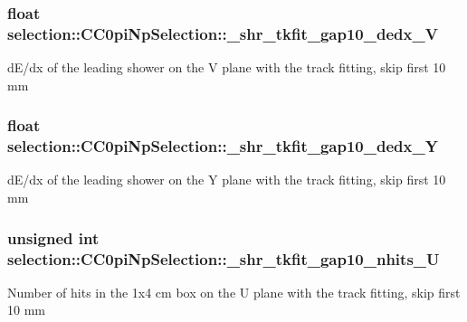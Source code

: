 \subsubsection[{\texorpdfstring{\+\_\+shr\+\_\+tkfit\+\_\+gap10\+\_\+dedx\+\_\+V}{_shr_tkfit_gap10_dedx_V}}]{\setlength{\rightskip}{0pt plus 5cm}float selection\+::\+C\+C0pi\+Np\+Selection\+::\+\_\+shr\+\_\+tkfit\+\_\+gap10\+\_\+dedx\+\_\+V\hspace{0.3cm}{\ttfamily [private]}}\hypertarget{classselection_1_1CC0piNpSelection_adf21374d01634ceeb71cdcb954c40b98}{}\label{classselection_1_1CC0piNpSelection_adf21374d01634ceeb71cdcb954c40b98}
d\+E/dx of the leading shower on the V plane with the track fitting, skip first 10 mm 
\subsubsection[{\texorpdfstring{\+\_\+shr\+\_\+tkfit\+\_\+gap10\+\_\+dedx\+\_\+Y}{_shr_tkfit_gap10_dedx_Y}}]{\setlength{\rightskip}{0pt plus 5cm}float selection\+::\+C\+C0pi\+Np\+Selection\+::\+\_\+shr\+\_\+tkfit\+\_\+gap10\+\_\+dedx\+\_\+Y\hspace{0.3cm}{\ttfamily [private]}}\hypertarget{classselection_1_1CC0piNpSelection_ae4ccdcc53f1b3e72cb360af8af316eb8}{}\label{classselection_1_1CC0piNpSelection_ae4ccdcc53f1b3e72cb360af8af316eb8}
d\+E/dx of the leading shower on the Y plane with the track fitting, skip first 10 mm 
\subsubsection[{\texorpdfstring{\+\_\+shr\+\_\+tkfit\+\_\+gap10\+\_\+nhits\+\_\+U}{_shr_tkfit_gap10_nhits_U}}]{\setlength{\rightskip}{0pt plus 5cm}unsigned int selection\+::\+C\+C0pi\+Np\+Selection\+::\+\_\+shr\+\_\+tkfit\+\_\+gap10\+\_\+nhits\+\_\+U\hspace{0.3cm}{\ttfamily [private]}}\hypertarget{classselection_1_1CC0piNpSelection_ae639e53ae1ea9c2bed506ca5d2e5c486}{}\label{classselection_1_1CC0piNpSelection_ae639e53ae1ea9c2bed506ca5d2e5c486}
Number of hits in the 1x4 cm box on the U plane with the track fitting, skip first 10 mm 

